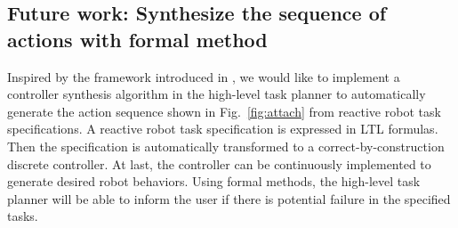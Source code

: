 \subsection{Future work: Synthesize the sequence of actions with formal method}
Inspired by the framework introduced in \cite{HKG2009}, we would like to implement a controller synthesis algorithm in the high-level task planner to automatically generate the action sequence shown in Fig.~\ref{fig:attach} from reactive robot task specifications.
A reactive robot task specification is expressed in LTL formulas.
Then the specification is automatically transformed to a correct-by-construction discrete controller.
At last, the controller can be continuously implemented to generate desired robot behaviors.
Using formal methods, the high-level task planner will be able to inform the user if there is potential failure in the specified tasks.



